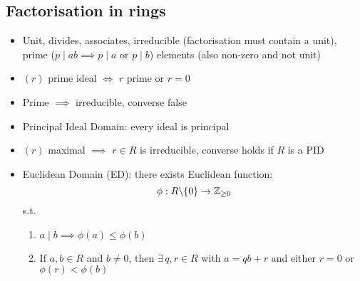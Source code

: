 \subsection*{Factorisation in rings}
\begin{itemize}
      \item Unit, divides, associates, irreducible (factorisation must contain a unit), prime ($p \mid ab \implies p \mid a$ or $ p \mid b$) elements (also non-zero and not unit)
      \item $(r)$ prime ideal $\iff$ $r$ prime or $r=0$
      \item Prime $\implies$ irreducible, converse false
      \item Principal Ideal Domain: every ideal is principal
      \item $(r)$ maximal $\implies$ $r \in R$ is irreducible, converse holds if $R$ is a PID
      \item Euclidean Domain (ED): there exists Euclidean function:
            \[\phi: R \backslash \{0\} \to \mathbb{Z}_{\geq 0}\] s.t.
            \begin{enumerate}[label = (\roman*)]
                  \item $a \mid b \implies \phi(a) \leq \phi(b)$
                  \item If $a,b \in R$ and $b \neq 0$, then $\exists \, q,r \in R$ with $a=qb+r$ and either $r=0$ or $\phi(r) < \phi(b)$
            \end{enumerate}
\end{itemize}


